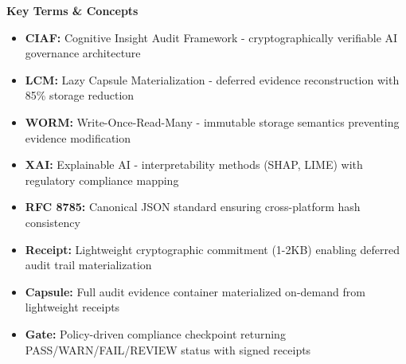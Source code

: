 \documentclass[12pt,a4paper]{article}
\begin{document}
\begin{technicalbox}
\textbf{Key Terms \& Concepts}
\begin{itemize}
\item \textbf{CIAF:} Cognitive Insight Audit Framework - cryptographically verifiable AI governance architecture
\item \textbf{LCM:} Lazy Capsule Materialization - deferred evidence reconstruction with 85\% storage reduction
\item \textbf{WORM:} Write-Once-Read-Many - immutable storage semantics preventing evidence modification
\item \textbf{XAI:} Explainable AI - interpretability methods (SHAP, LIME) with regulatory compliance mapping
\item \textbf{RFC 8785:} Canonical JSON standard ensuring cross-platform hash consistency
\item \textbf{Receipt:} Lightweight cryptographic commitment (1-2KB) enabling deferred audit trail materialization
\item \textbf{Capsule:} Full audit evidence container materialized on-demand from lightweight receipts
\item \textbf{Gate:} Policy-driven compliance checkpoint returning PASS/WARN/FAIL/REVIEW status with signed receipts
\end{itemize}
\end{technicalbox}

\vfill
\end{document}
